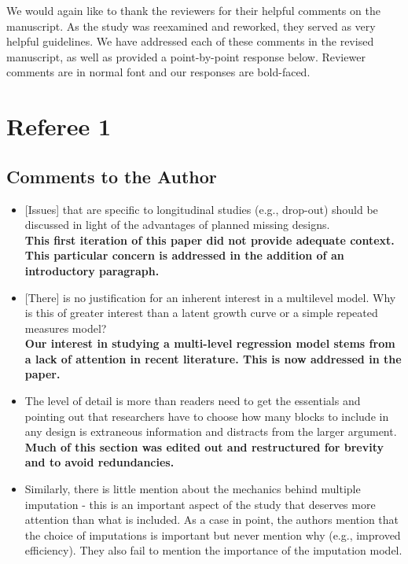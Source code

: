 \documentclass[letterpaper,12pt]{article}\usepackage[]{graphicx}\usepackage[]{color}
\begin{document}
We would again like to thank the reviewers for their helpful comments on the manuscript. As the study was reexamined and reworked, they served as very helpful guidelines. We have addressed each of these comments in the revised manuscript, as well as provided a point-by-point response below. Reviewer comments are in normal font and our responses are bold-faced.  


\section{Referee 1}
\subsection{Comments to the Author}
\begin{itemize}

\item {[Issues]} that are specific to longitudinal studies (e.g., drop-out) should be discussed in light of the advantages of planned missing designs.\\

{\bf This first iteration of this paper did not provide adequate context. This particular concern is addressed in the addition of an introductory paragraph.}\\

\item {[There]} is no justification for an inherent interest in a multilevel model. Why is this of greater interest than a latent growth curve or a simple repeated measures model?\\

{\bf Our interest in studying a multi-level regression model stems from a lack of attention in recent literature. This is now addressed in the paper.}\\

\item  The level of detail is more than readers need to get the essentials and pointing out that researchers have to choose how many blocks to include in any design is extraneous information and distracts from the larger argument.\\

{\bf Much of this section was edited out and restructured for brevity and to avoid redundancies.}\\

\item Similarly, there is little mention about the mechanics behind multiple imputation - this is an important aspect of the study that deserves more attention than what is included. As a case in point, the authors mention that the choice of imputations is important but never mention why (e.g., improved efficiency). They also fail to mention the importance of the imputation model.\\


\end{itemize}
\end{document}

